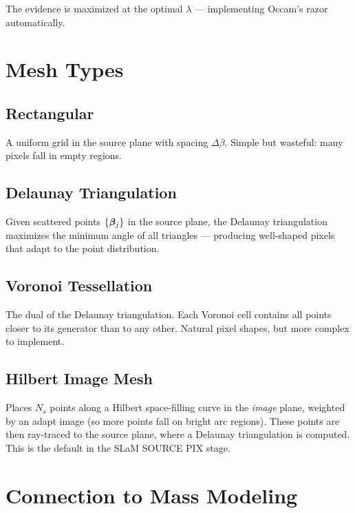 \documentclass[11pt, letterpaper]{article}
\begin{document}
The evidence is maximized at the optimal $\lambda$ --- implementing
Occam's razor automatically.

\section{Mesh Types}
\label{sec:meshes}

\subsection{Rectangular}
A uniform grid in the source plane with spacing $\Delta\beta$.
Simple but wasteful: many pixels fall in empty regions.

\subsection{Delaunay Triangulation}
Given scattered points $\{\bm{\beta}_j\}$ in the source plane, the Delaunay
triangulation maximizes the minimum angle of all triangles --- producing
well-shaped pixels that adapt to the point distribution.

\subsection{Voronoi Tessellation}
The dual of the Delaunay triangulation. Each Voronoi cell contains
all points closer to its generator than to any other. Natural pixel
shapes, but more complex to implement.

\subsection{Hilbert Image Mesh}
Places $N_s$ points along a Hilbert space-filling curve in the
\emph{image} plane, weighted by an adapt image (so more points
fall on bright arc regions). These points are then ray-traced to
the source plane, where a Delaunay triangulation is computed.
This is the default in the SLaM SOURCE PIX stage.

\section{Connection to Mass Modeling}
\label{sec:mass-connection}
\end{document}
